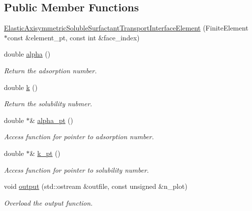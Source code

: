 \subsection*{Public Member Functions}
\begin{DoxyCompactItemize}
\item 
\hyperlink{classElasticAxisymmetricSolubleSurfactantTransportInterfaceElement_a0df5772b5f387b69601c892feb4f6da7}{Elastic\+Axisymmetric\+Soluble\+Surfactant\+Transport\+Interface\+Element} (Finite\+Element $\ast$const \&element\+\_\+pt, const int \&face\+\_\+index)
\item 
double \hyperlink{classElasticAxisymmetricSolubleSurfactantTransportInterfaceElement_a5cf569c81997dde4f4f2a8d5ee1069ca}{alpha} ()
\begin{DoxyCompactList}\small\item\em Return the adsorption number. \end{DoxyCompactList}\item 
double \hyperlink{classElasticAxisymmetricSolubleSurfactantTransportInterfaceElement_a90120618d2868a87ee3b8f95c60f29b2}{k} ()
\begin{DoxyCompactList}\small\item\em Return the solubility nubmer. \end{DoxyCompactList}\item 
double $\ast$\& \hyperlink{classElasticAxisymmetricSolubleSurfactantTransportInterfaceElement_a29024a8b66da3d19bd199130e3c04d81}{alpha\+\_\+pt} ()
\begin{DoxyCompactList}\small\item\em Access function for pointer to adsorption number. \end{DoxyCompactList}\item 
double $\ast$\& \hyperlink{classElasticAxisymmetricSolubleSurfactantTransportInterfaceElement_a247b428c085e2d21385592af55b18539}{k\+\_\+pt} ()
\begin{DoxyCompactList}\small\item\em Access function for pointer to solubility number. \end{DoxyCompactList}\item 
void \hyperlink{classElasticAxisymmetricSolubleSurfactantTransportInterfaceElement_a13366c67ba0fdbd1aef64d9cc55e6995}{output} (std\+::ostream \&outfile, const unsigned \&n\+\_\+plot)
\begin{DoxyCompactList}\small\item\em Overload the output function. \end{DoxyCompactList}\end{DoxyCompactItemize}
